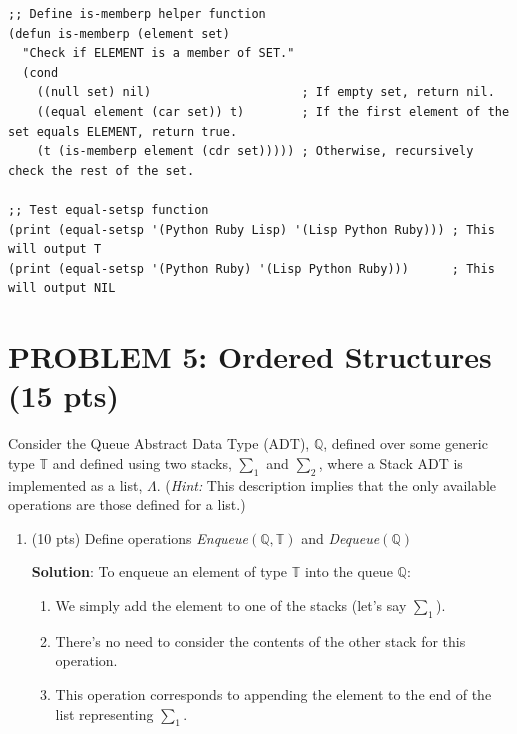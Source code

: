 \documentclass[12pt]{article}
\begin{document}
\begin{spacing}{1.5}
\begin{enumerate}
\begin{itemize}
\begin{lstlisting}
;; Define is-memberp helper function
(defun is-memberp (element set)
  "Check if ELEMENT is a member of SET."
  (cond
    ((null set) nil)                     ; If empty set, return nil.
    ((equal element (car set)) t)        ; If the first element of the set equals ELEMENT, return true.
    (t (is-memberp element (cdr set))))) ; Otherwise, recursively check the rest of the set.

;; Test equal-setsp function
(print (equal-setsp '(Python Ruby Lisp) '(Lisp Python Ruby))) ; This will output T
(print (equal-setsp '(Python Ruby) '(Lisp Python Ruby)))      ; This will output NIL
		      	      \end{lstlisting}
		      	      		      	                      
		      \end{itemize}
		      		                  
	\end{enumerate}
		        
	\newpage
	\section*{PROBLEM 5: Ordered Structures (15 pts)}
	Consider the Queue Abstract Data Type (ADT), $\mathbb{Q}$, defined over some generic type $\mathbb{T}$ and defined using two stacks, $\sum_1$ and $\sum_2$, where a Stack ADT is implemented as a list, $\Lambda$. (\textit{Hint: } This description implies that the only available operations are those defined for a list.) 
		
	\begin{enumerate}
		\item (10 pts) Define operations \textit{Enqueue}$(\mathbb{Q},\mathbb{T})$ and \textit{Dequeue}$(\mathbb{Q})$
		      		      
		      \textbf{Solution}: To enqueue an element of type $\mathbb{T}$ into the queue $\mathbb{Q}$:
		      		      
		      \begin{enumerate}
		      	\item We simply add the element to one of the stacks (let's say $\sum_1$).
		      	\item There's no need to consider the contents of the other stack for this operation.
		      	\item This operation corresponds to appending the element to the end of the list representing $\sum_1$.
		      \end{enumerate} 
		      		      

\end{enumerate}
\end{spacing}
\end{document}
